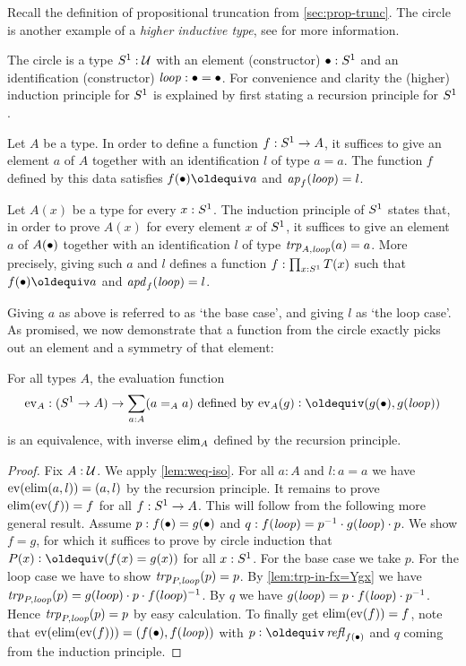 Recall the definition of propositional truncation from \cref{sec:prop-trunc}.
The circle is another example of a \emph{higher inductive type},
see \cite[Ch. 6]{hottbook} for more information.

\begin{definition}
  \label{def:circle}
The circle is a type $S^1:\mathcal{U}$ with an element (constructor) $\bullet : S^1$ and 
an identification (constructor) $\mathit{loop}: \bullet=\bullet$. For convenience and
clarity the (higher) induction principle for $S^1$ is explained
by first stating a recursion principle for $S^1$.

Let $A$ be a type. In order to define a function $f:S^1\to A$,
it suffices to give an element $a$ of $A$ together with an
identification $l$ of type $a=a$. The function $f$ defined
by this data satisfies $f(\base)\jdeq a$ and $\mathop{{\it ap}_{f}}(\mathit{loop})=l$.

Let $A(x)$ be a type for every $x:S^1$. The induction principle of $S^1$
states that, in order to prove $A(x)$ for every element $x$ of $S^1$,
it suffices to give an element $a$ of $A(\bullet)$ together with an
identification $l$ of type $\mathord{\mathit{trp}}_{A,\mathit{loop}}(a) = a$. More precisely,
giving such $a$ and $l$ defines a function $f:\prod_{x:S^1}T(x)$ such that
$f(\base)\jdeq a$ and $\mathop{{\it apd}_{f}}(\mathit{loop})=l$. 
\end{definition}

Giving $a$ as above is referred to as `the base case', and
giving $l$ as `the loop case'.
As promised, we now demonstrate that a function from the circle exactly 
picks out an element and a symmetry of that element:

\begin{lemma}\label{lem:freeloopspace}
For all types $A$, the evaluation function 
\[
\ev_A : (\Sc\to A)\to \sum_{a:A}(a=_Aa)\text{~defined by~} 
\ev_A(g)\defeq (g(\base),g(\Sloop))
\]
is an equivalence, with inverse $\mathrm{elim}_A$ defined by the recursion principle.  
\end{lemma}
\begin{proof}
Fix $A:\mathcal{U}$. We apply \cref{lem:weq-iso}. 
For all $a:A$ and $l:a=a$ we have $\mathrm{ev}(\mathrm{elim}(a,l))=(a,l)$
by the recursion principle. It remains to prove
$\mathrm{elim}(\mathrm{ev}(f))=f$ for all $f:S^1\to A$. This will follow
from the following more general result. Assume 
$p: f(\bullet)= g(\bullet)$ and $q: f(\mathit{loop}) = p^{-1}\cdot g(\mathit{loop})\cdot p$.
We show $f=g$, for which it suffices to prove by circle induction
that $P(x)\defeq(f(x)=g(x))$ for all $x:S^1$.
For the base case we take $p$.
For the loop case we have to show $\mathord{\mathit{trp}}_{P,\mathit{loop}}(p)=p$.
By \cref{lem:trp-in-fx=Ygx} we have 
$\mathord{\mathit{trp}}_{P,\mathit{loop}}(p)=g(loop)\cdot p \cdot f(loop)^{-1}$. 
By $q$ we have $g(\mathit{loop}) = p\cdot f(\mathit{loop}) \cdot p^{-1}$.
Hence $\mathord{\mathit{trp}}_{P,\mathit{loop}}(p)=p$ by easy calculation.
To finally get $\mathrm{elim}(\mathrm{ev}(f))=f$,
note that $\mathrm{ev}(\mathrm{elim}(\mathrm{ev}(f)))=(f(\bullet),f(\mathit{loop}))$ with $p\defeq\refl{f(\base)}$
and $q$ coming from the induction principle.
\end{proof}

